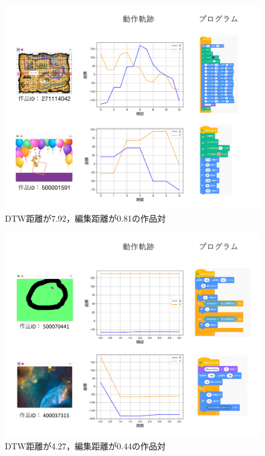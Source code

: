 \documentclass[T,J]{fose} %
\begin{document}
\begin{figure}[t]
	\centering
	\includegraphics[width=1.0\linewidth]{Okamoto_fig/quadrant-1.pdf}
	\caption{DTW距離が7.92，編集距離が0.81の作品対}
	\label{fig:distance-boxplot}
\end{figure}

\begin{figure}[t]
	\centering
	\includegraphics[width=1.0\linewidth]{Okamoto_fig/quadrant-2.pdf}
	\caption{DTW距離が4.27，編集距離が0.44の作品対}
	\label{fig:distance-boxplot}
\end{figure}
\end{document}

